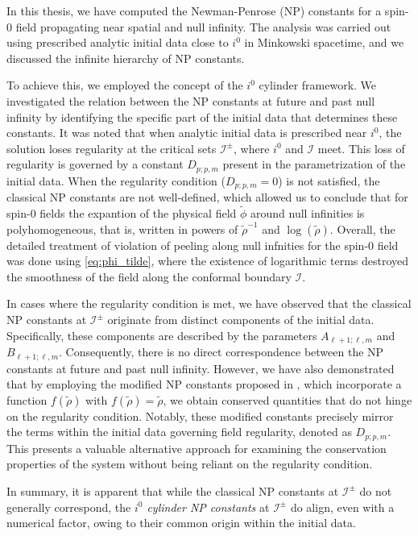 In this thesis, we have computed the Newman-Penrose (NP) constants for a spin-0 field propagating near spatial and null infinity. The analysis was carried out using prescribed analytic initial data close to $i^0$ in Minkowski spacetime, and we discussed the infinite hierarchy of NP constants.

To achieve this, we employed the concept of the $i^0$ cylinder framework. We investigated the relation between the NP constants at future and past null infinity by identifying the specific part of the initial data that determines these constants. It was noted that when analytic initial data is prescribed near $i^0$, the solution loses regularity at the critical sets $\mathcal{I}^{\pm}$, where $i^0$ and $\mathscr{I}$ meet. This loss of regularity is governed by a constant $D_{p;p,m}$ present in the parametrization of the initial data. When the regularity condition ($D_{p;p,m} = 0$) is not satisfied, the classical NP constants are not well-defined, which allowed us to conclude that for spin-0 fields the expantion of the physical field $\tilde{\phi}$ around null infinities is polyhomogeneous, that is, written in powers of $\tilde{\rho}^{-1}$ and $\log(\tilde{\rho})$. 
Overall, the detailed treatment of violation of peeling along null infnities for the spin-0 field was done using \eqref{eq:phi_tilde}, where the existence of logarithmic terms destroyed the smoothness of the field along the conformal boundary $\mathscr{I}$.

In cases where the regularity condition is met, we have observed that the classical NP constants at $\mathscr{I}^{\pm}$ originate from distinct components of the initial data. Specifically, these components are described by the parameters $A_{\ell+1;\ell,m}$ and $B_{\ell+1;\ell,m}$.
Consequently, there is no direct correspondence between the NP constants at future and past null infinity.
However, we have also demonstrated that by employing the modified NP constants proposed in \cite{Keh21_a}, which incorporate a function $f(\tilde{\rho})$ with $f(\tilde{\rho})=\tilde{\rho}$, we obtain conserved quantities that do not hinge on the regularity condition. Notably, these modified constants precisely mirror the terms within the initial data governing field regularity, denoted as $D_{p;p,m}$. This presents a valuable alternative approach for examining the conservation properties of the system without being reliant on the regularity condition.

In summary, it is apparent that while the classical NP constants at $\mathscr{I}^{\pm}$ do not generally correspond, the \emph{$i^0$ cylinder NP constants} at $\mathscr{I}^{\pm}$ do align, even with a numerical factor, owing to their common origin within the initial data.


